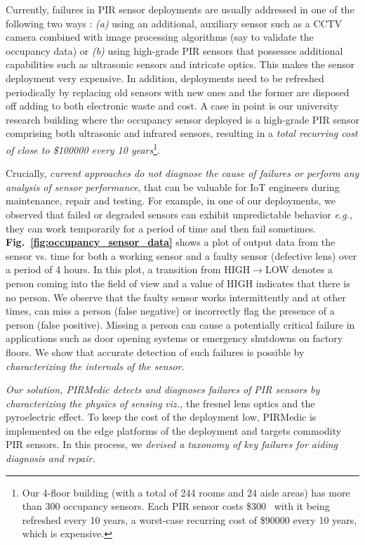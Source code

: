 \documentclass[manuscript]{acmart}
\newcommand{\eg}{{\it e.g.,}\xspace}
\newcommand{\viz}{{\it viz.,}\xspace}
\newcommand{\ca}{{\it (a) }}
\newcommand{\cb}{{\it (b) }}
\newcommand{\sol}{{PIRMedic}\xspace}
\begin{document}
Currently, failures in PIR sensor deployments are usually addressed in one of the following two ways : \ca using an additional, auxiliary sensor such as a CCTV camera combined with image processing algorithms (say to validate the occupancy data) or \cb using high-grade PIR sensors that possesses additional capabilities such as ultrasonic sensors and intricate optics. This makes the sensor deployment very expensive. In addition, deployments need to be refreshed periodically by replacing old sensors with new ones and the former are disposed off adding to both electronic waste and cost. A case in point is our university research building where the occupancy sensor deployed is a high-grade PIR sensor comprising both ultrasonic and infrared sensors, resulting in a \emph{total recurring cost of close to \$100000 every 10 years}\footnote{Our 4-floor building (with a total of 244 rooms and 24 aisle areas) has more than 300 occupancy sensors. Each PIR sensor costs \$300~\cite{hubbell_ADT1600WRP, hubbell_ATD2000CRP} with it being refreshed every 10 years, a worst-case recurring cost of \$90000 every 10 years, which is expensive.}.




Crucially, \textit{current approaches do not diagnose the cause of failures or perform any analysis of sensor performance}, that can be valuable for IoT engineers during maintenance, repair and testing. For example, in one of our deployments, we observed that failed or degraded sensors can exhibit unpredictable behavior \eg they can work temporarily for a period of time and then fail sometimes. {\bfseries  Fig.~\ref{fig:occupancy_sensor_data}} shows a plot of output data from the sensor vs. time for both a working sensor and a faulty sensor (defective lens) over a period of 4 hours.
In this plot, a transition from HIGH$\rightarrow$LOW denotes a person coming into the field of view and a value of HIGH indicates that there is no person. We observe that the faulty sensor works intermittently and at other times, can miss a person (false negative) or incorrectly flag the presence of a person (false positive).
Missing a person can cause a potentially critical failure in applications such as door opening systems or emergency shutdowns on factory floors.
We show that accurate detection of such failures is possible by \textit{characterizing the internals of the sensor.}




\emph{Our solution, \sol detects and diagnoses failures of PIR sensors by characterizing the physics of sensing} \viz the fresnel lens optics and the pyroelectric effect. To keep the cost of the deployment low, \sol is implemented on the edge platforms of the deployment and targets commodity PIR sensors.
In this process, we \emph{devised a taxonomy of key failures for aiding diagnosis and repair.} 
\end{document}
